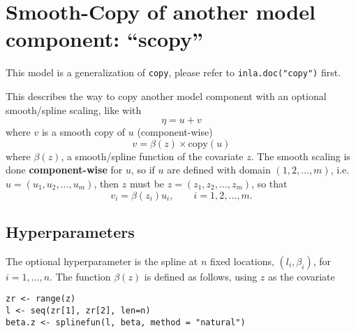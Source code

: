 \documentclass[a4paper,11pt]{article}
\begin{document}
\section*{Smooth-Copy of another model component: ``scopy''}

This model is a generalization of \texttt{copy}, please refer to
\texttt{inla.doc("copy")} first.

This describes the way to copy another model component with an
optional smooth/spline scaling, like with
\begin{displaymath}
    \eta = u + v
\end{displaymath}
where $v$ is a smooth copy of $u$ (component-wise)
\begin{displaymath}
    v = \beta(z)\times\text{copy}(u)
\end{displaymath}
where $\beta(z)$, a smooth/spline function of the covariate $z$. The
smooth scaling is done \textbf{component-wise} for $u$, so if $u$ are
defined with domain $(1, 2, \ldots, m)$, i.e.\
$u=(u_1, u_2, \ldots, u_m)$, then $z$ must be
$z=(z_1, z_2, \ldots, z_m)$, so that
\begin{displaymath}
    v_i = \beta(z_i) u_i, \qquad i=1, 2, \ldots, m.
\end{displaymath}

\subsection*{Hyperparameters}

The optional hyperparameter is the spline at $n$ fixed locations,
$(l_i, \beta_i)$, for $i=1, \ldots, n$. The function $\beta(z)$ is
defined as follows, using $z$ as the covariate
\begin{verbatim}
zr <- range(z)
l <- seq(zr[1], zr[2], len=n)
beta.z <- splinefun(l, beta, method = "natural")
\end{verbatim}
\end{document}
